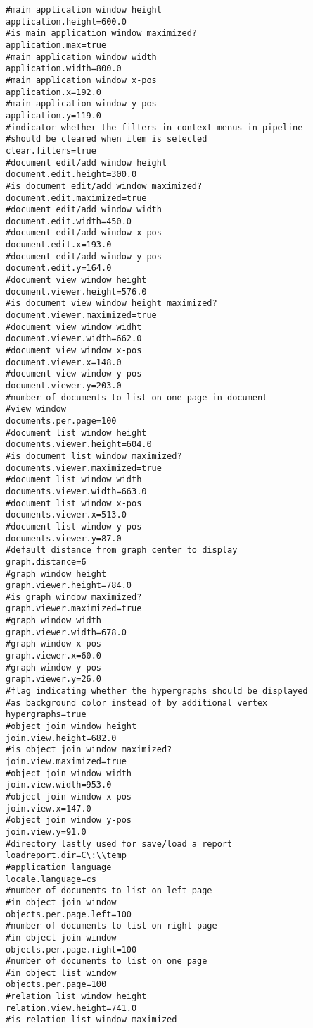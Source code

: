 \documentclass[12pt,a4paper]{report}
\begin{document}
\begin{lstlisting}[frame=single,language=properties]
#main application window height
application.height=600.0
#is main application window maximized?
application.max=true
#main application window width
application.width=800.0
#main application window x-pos
application.x=192.0
#main application window y-pos
application.y=119.0
#indicator whether the filters in context menus in pipeline
#should be cleared when item is selected
clear.filters=true
#document edit/add window height
document.edit.height=300.0
#is document edit/add window maximized?
document.edit.maximized=true
#document edit/add window width
document.edit.width=450.0
#document edit/add window x-pos
document.edit.x=193.0
#document edit/add window y-pos
document.edit.y=164.0
#document view window height
document.viewer.height=576.0
#is document view window height maximized?
document.viewer.maximized=true
#document view window widht
document.viewer.width=662.0
#document view window x-pos
document.viewer.x=148.0
#document view window y-pos
document.viewer.y=203.0
#number of documents to list on one page in document
#view window
documents.per.page=100
#document list window height
documents.viewer.height=604.0
#is document list window maximized?
documents.viewer.maximized=true
#document list window width
documents.viewer.width=663.0
#document list window x-pos
documents.viewer.x=513.0
#document list window y-pos
documents.viewer.y=87.0
#default distance from graph center to display
graph.distance=6
#graph window height
graph.viewer.height=784.0
#is graph window maximized?
graph.viewer.maximized=true
#graph window width
graph.viewer.width=678.0
#graph window x-pos
graph.viewer.x=60.0
#graph window y-pos
graph.viewer.y=26.0
#flag indicating whether the hypergraphs should be displayed
#as background color instead of by additional vertex
hypergraphs=true
#object join window height
join.view.height=682.0
#is object join window maximized?
join.view.maximized=true
#object join window width
join.view.width=953.0
#object join window x-pos
join.view.x=147.0
#object join window y-pos
join.view.y=91.0
#directory lastly used for save/load a report
loadreport.dir=C\:\\temp
#application language
locale.language=cs
#number of documents to list on left page
#in object join window
objects.per.page.left=100
#number of documents to list on right page
#in object join window
objects.per.page.right=100
#number of documents to list on one page
#in object list window
objects.per.page=100
#relation list window height
relation.view.height=741.0
#is relation list window maximized

\end{lstlisting}
\end{document}
